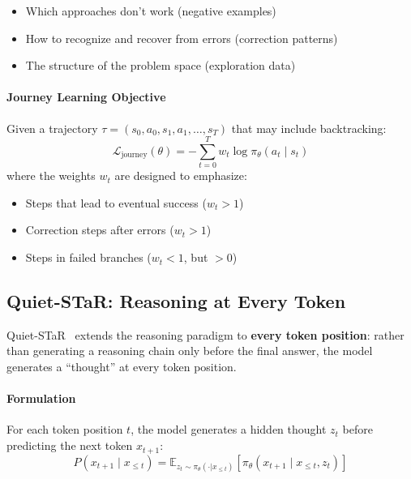 \begin{itemize}
  \item Which approaches don’t work (negative examples)
  \item How to recognize and recover from errors (correction patterns)
  \item The structure of the problem space (exploration data)
\end{itemize}

\paragraph{Journey Learning Objective}
\label{journey-learning-objective}

Given a trajectory $\tau = (s_0, a_0, s_1, a_1, \ldots, s_T)$ that may include backtracking: 
\begin{equation}
    \mathcal{L}_{\text{journey}}(\theta) = -\sum_{t=0}^{T} w_t \log \pi_\theta(a_t \mid s_t)
\end{equation}
 where the weights $w_t$ are designed to emphasize:

\begin{itemize}
  \item Steps that lead to eventual success ($w_t > 1$)
  \item Correction steps after errors ($w_t > 1$)
  \item Steps in failed branches ($w_t < 1$, but $> 0$)
\end{itemize}

\subsection{Quiet-STaR: Reasoning at Every Token}
\label{quiet-star-reasoning-at-every-token}

Quiet-STaR~\cite{zelikman2024quietstar} extends the reasoning paradigm to \textbf{every token position}: rather than generating a reasoning chain only before the final answer, the model generates a ``thought'' at every token position.

\paragraph{Formulation}
\label{formulation}

For each token position $t$, the model generates a hidden thought $z_t$ before predicting the next token $x_{t+1}$: 
\begin{equation}
    P(x_{t+1} \mid x_{\leq t}) = \mathbb{E}_{z_t \sim \pi_\theta(\cdot | x_{\leq t})} \left[ \pi_\theta(x_{t+1} \mid x_{\leq t}, z_t) \right]
\end{equation}

